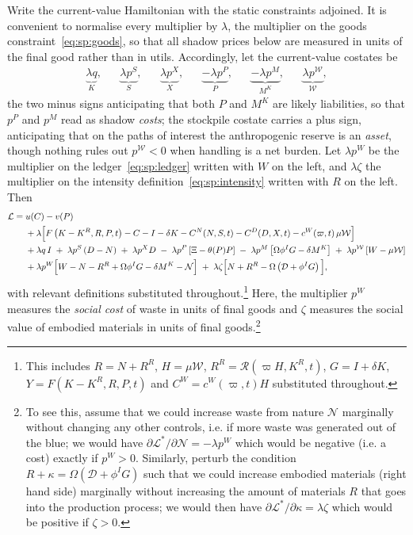  Write the current-value Hamiltonian with the static constraints
adjoined. It is convenient to normalise every multiplier by $\lambda$, the multiplier on the goods
constraint~\eqref{eq:sp:goods}, so that all shadow prices below are measured in units of the final
good rather than in utils. Accordingly, let the current-value costates be
\begin{align}
\underbrace{\lambda q}_{K},
&&
\underbrace{\lambda p^S}_{S},
&&
\underbrace{\lambda p^X}_{X},
&&
\underbrace{-\lambda p^P}_{P},
&&
\underbrace{-\lambda p^M}_{M^K},
&&
\underbrace{\lambda p^{\mathcal W}}_{\mathcal W},
\label{eq:sp:costates-def}
\end{align}
the two minus signs anticipating that both $P$ and $M^K$ are likely liabilities, so that $p^P$ and $p^M$ read as shadow \emph{costs}; the stockpile costate carries a plus sign, anticipating that on the paths of interest the anthropogenic reserve is an \emph{asset}, though nothing rules out $p^{\mathcal W}<0$ when handling is a net burden. Let $\lambda p^W$ be the multiplier on the ledger~\eqref{eq:sp:ledger} written with $W$ on the left, and $\lambda\zeta$ the multiplier on the intensity definition~\eqref{eq:sp:intensity} written with
$R$ on the left. Then
\begin{align}
\mathcal L
={}& u(C)-v(P)
\notag\\
&+\lambda\Big[F\left(K-K^R,R,P,t\right)-C-I-\delta K-C^N(N,S,t)-C^D(D,X,t)-c^W\!\left(\varpi,t\right)\mu\mathcal W\Big]
\notag\\
&+\lambda q\,I
\;+\;\lambda p^S\left(D-N\right)
\;+\;\lambda p^X D
\;-\;\lambda p^P\left[\Xi-\theta(P)P\right]
\;-\;\lambda p^M\left[\Omega\phi^IG-\delta M^K\right]
\;+\;\lambda p^{\mathcal W}\left[W-\mu\mathcal W\right]
\notag\\
&+\lambda p^W\Big[W-N-R^R+\Omega\phi^IG-\delta M^K-\mathcal N\Big]
\;+\;\lambda \zeta\Big[N+R^R-\Omega\left(\mathcal D+\phi^IG\right)\Big],
\label{eq:sp:lagrangian}
\end{align}
with relevant definitions substituted throughout.\footnote{This includes $R=N+R^R$, $H=\mu\mathcal W$, $R^R=\mathcal R\left(\varpi H,K^R,t\right)$, $G=I+\delta K$, $Y=F\left(K-K^R,R,P,t\right)$
and $C^W=c^W\!\left(\varpi,t\right)H$ substituted throughout.} Here, the multiplier $p^W$ measures the \textit{social cost} of waste in units of final goods and $\zeta$ measures the social value of embodied materials in units of final goods.\footnote{To see this, assume that we could increase waste from nature $\mathcal{N}$ marginally without changing any other controls, i.e. if more waste was generated out of the blue; we would have $\partial \mathcal L^*/\partial \mathcal N = - \lambda p^W$ which would be negative (i.e. a cost) exactly if $p^W>0$. Similarly, perturb the condition $R + \kappa = \Omega \left(\mathcal{D}+\phi^IG\right)$ such that we could increase embodied materials (right hand side) marginally without increasing the amount of materials $R$ that goes into the production process; we would then have $\partial \mathcal L^*/\partial \kappa = \lambda \zeta$ which would be positive if $\zeta>0$.} 



